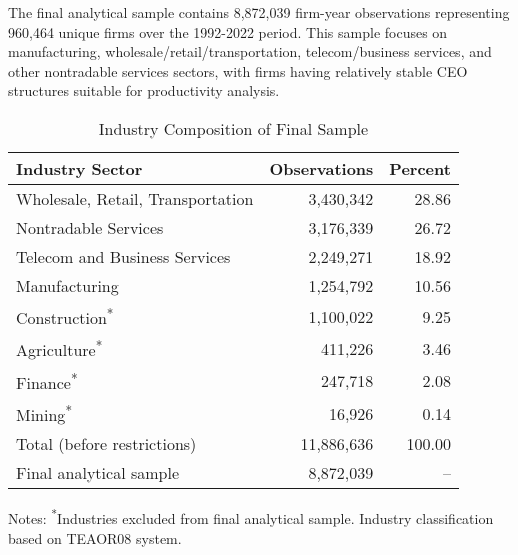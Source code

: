 \documentclass[11pt,a4paper]{article}
\begin{document}
The final analytical sample contains 8,872,039 firm-year observations representing 960,464 unique firms over the 1992-2022 period. This sample focuses on manufacturing, wholesale/retail/transportation, telecom/business services, and other nontradable services sectors, with firms having relatively stable CEO structures suitable for productivity analysis.

\begin{table}[htbp]
\centering
\caption{Industry Composition of Final Sample}
\label{tab:industry}
\begin{tabular}{lrr}
\toprule
Industry Sector & Observations & Percent \\
\midrule
Wholesale, Retail, Transportation & 3,430,342 & 28.86 \\
Nontradable Services & 3,176,339 & 26.72 \\
Telecom and Business Services & 2,249,271 & 18.92 \\
Manufacturing & 1,254,792 & 10.56 \\
Construction\textsuperscript{*} & 1,100,022 & 9.25 \\
Agriculture\textsuperscript{*} & 411,226 & 3.46 \\
Finance\textsuperscript{*} & 247,718 & 2.08 \\
Mining\textsuperscript{*} & 16,926 & 0.14 \\
\midrule
Total (before restrictions) & 11,886,636 & 100.00 \\
Final analytical sample & 8,872,039 & -- \\
\bottomrule
\end{tabular}
\footnotesize
Notes: \textsuperscript{*}Industries excluded from final analytical sample. Industry classification based on TEAOR08 system.
\end{table}
\end{document}
